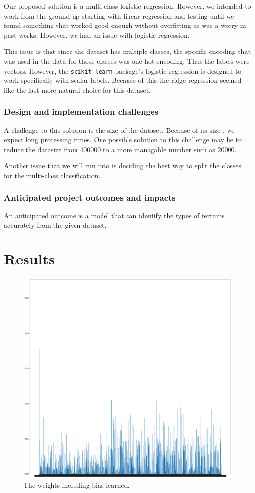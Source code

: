 \documentclass[11pt]{report}
\begin{document}
Our proposed solution is a multi-class logistic regression.
However, we intended to work from the ground up
starting with linear regression
and testing until we found something that worked good enough
without overfitting
as was a worry in past works.
However, we had an issue with logistic regression.

This issue is that since the dataset has multiple classes,
the specific encoding that was used in the data for those classes was one-hot encoding.
Thus the labels were vectors.
However, the \texttt{scikit-learn} package's logistic regression is designed to work specifically with scalar labels.
Because of this the ridge regression seemed like the last more natural choice for this dataset.

\subsubsection{Design and implementation challenges}

A challenge to this solution is the size of the dataset.
Because of its size , we expect long processing times.
One possible solution to this challenge may be to reduce the datasize
from \(\num{400000}\) to a more managable number such as
\(\num{20000}\).

Another issue that we will run into is deciding the best way to split the classes for the multi-class classification.

\subsubsection{Anticipated project outcomes and impacts}

An anticipated outcome is a model that can identify the types of terrains accurately from the given dataset.

\section{Results}

\begin{figure}
    \centering
    \includegraphics[width=0.75\linewidth]{ipynb/output_44_0.png}
    \caption{The weights including bias learned.}
    \label{fig:weights}
\end{figure}
\end{document}
